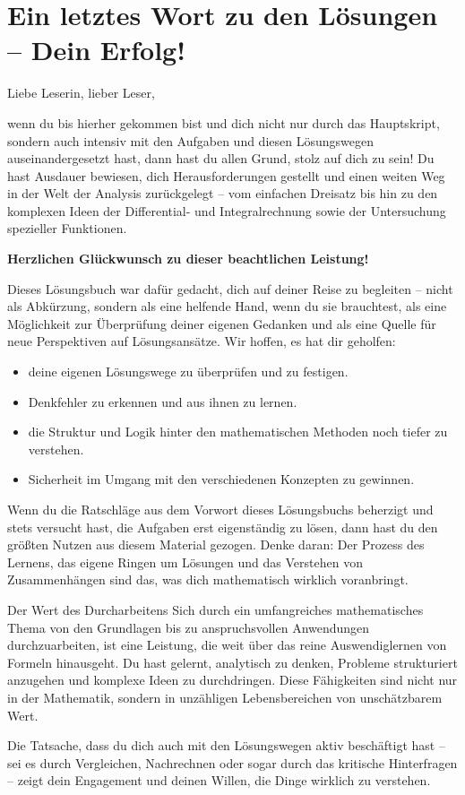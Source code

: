 \section*{Ein letztes Wort zu den Lösungen – Dein Erfolg!}
\label{sec:abschluss_loesungsbuch}

Liebe Leserin, lieber Leser,

wenn du bis hierher gekommen bist und dich nicht nur durch das Hauptskript, sondern auch intensiv mit den Aufgaben und diesen Lösungswegen auseinandergesetzt hast, dann hast du allen Grund, stolz auf dich zu sein! \smiley{} Du hast Ausdauer bewiesen, dich Herausforderungen gestellt und einen weiten Weg in der Welt der Analysis zurückgelegt – vom einfachen Dreisatz bis hin zu den komplexen Ideen der Differential- und Integralrechnung sowie der Untersuchung spezieller Funktionen.

\begin{center}
    \Large\bfseries Herzlichen Glückwunsch zu dieser beachtlichen Leistung!
\end{center}
\vspace{1em}

Dieses Lösungsbuch war dafür gedacht, dich auf deiner Reise zu begleiten – nicht als Abkürzung, sondern als eine helfende Hand, wenn du sie brauchtest, als eine Möglichkeit zur Überprüfung deiner eigenen Gedanken und als eine Quelle für neue Perspektiven auf Lösungsansätze. Wir hoffen, es hat dir geholfen:
\begin{itemize}
    \item deine eigenen Lösungswege zu überprüfen und zu festigen.
    \item Denkfehler zu erkennen und aus ihnen zu lernen.
    \item die Struktur und Logik hinter den mathematischen Methoden noch tiefer zu verstehen.
    \item Sicherheit im Umgang mit den verschiedenen Konzepten zu gewinnen.
\end{itemize}

Wenn du die Ratschläge aus dem Vorwort dieses Lösungsbuchs beherzigt und stets versucht hast, die Aufgaben erst eigenständig zu lösen, dann hast du den größten Nutzen aus diesem Material gezogen. Denke daran: Der Prozess des Lernens, das eigene Ringen um Lösungen und das Verstehen von Zusammenhängen sind das, was dich mathematisch wirklich voranbringt.

\begin{infoboxumgebung}{Der Wert des Durcharbeitens}
Sich durch ein umfangreiches mathematisches Thema von den Grundlagen bis zu anspruchsvollen Anwendungen durchzuarbeiten, ist eine Leistung, die weit über das reine Auswendiglernen von Formeln hinausgeht. Du hast gelernt, analytisch zu denken, Probleme strukturiert anzugehen und komplexe Ideen zu durchdringen. Diese Fähigkeiten sind nicht nur in der Mathematik, sondern in unzähligen Lebensbereichen von unschätzbarem Wert.

Die Tatsache, dass du dich auch mit den Lösungswegen aktiv beschäftigt hast – sei es durch Vergleichen, Nachrechnen oder sogar durch das kritische Hinterfragen – zeigt dein Engagement und deinen Willen, die Dinge wirklich zu verstehen.
\end{infoboxumgebung}

